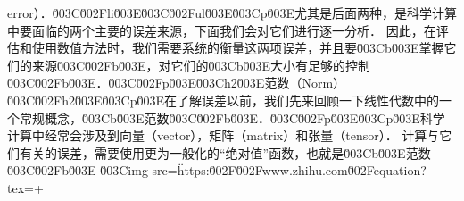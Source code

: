 error）．\u003C\u002Fli\u003E\u003C\u002Ful\u003E\u003Cp\u003E尤其是后面两种，是科学计算中要面临的两个主要的误差来源，下面我们会对它们进行逐一分析． 因此，在评估和使用数值方法时，我们需要系统的衡量这两项误差，并且要\u003Cb\u003E掌握它们的来源\u003C\u002Fb\u003E，对它们的\u003Cb\u003E大小有足够的控制\u003C\u002Fb\u003E．\u003C\u002Fp\u003E\u003Ch2\u003E范数（Norm）\u003C\u002Fh2\u003E\u003Cp\u003E在了解误差以前，我们先来回顾一下线性代数中的一个常规概念，\u003Cb\u003E范数\u003C\u002Fb\u003E．\u003C\u002Fp\u003E\u003Cp\u003E科学计算中经常会涉及到向量（vector），矩阵（matrix）和张量（tensor）． 计算与它们有关的误差，需要使用更为一般化的“绝对值”函数，也就是\u003Cb\u003E范数\u003C\u002Fb\u003E \u003Cimg src=\"https:\u002F\u002Fwww.zhihu.com\u002Fequation?tex=+%